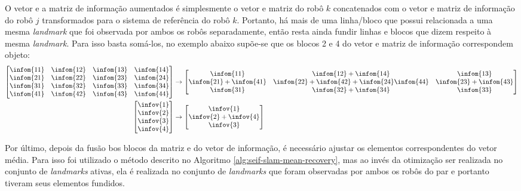 O vetor e a matriz de informação aumentados é simplesmente o vetor e matriz do robô $k$ concatenados com o 
vetor e matriz de informação do robô $j$ transformados para o sistema 
de referência do robô $k$. Portanto, há mais de uma linha/bloco que 
possui relacionada a uma mesma \textit{landmark} que foi observada 
por ambos os robôs separadamente, então resta ainda fundir linhas e 
blocos que dizem respeito à mesma \textit{landmark}. Para isso basta 
somá-los, no exemplo abaixo supõe-se que os blocos 2 e 4 do vetor e 
matriz de informação correspondem objeto:
\begin{align}
  \begin{bmatrix}
    \infom{11} & \infom{12} & \infom{13} & \infom{14}\\
    \infom{21} & \infom{22} & \infom{23} & \infom{24}\\
    \infom{31} & \infom{32} & \infom{33} & \infom{34}\\
    \infom{41} & \infom{42} & \infom{43} & \infom{44}
  \end{bmatrix} &\rightarrow \begin{bmatrix}
    \infom{11} & \infom{12} + \infom{14} & \infom{13}\\
    \infom{21}+\infom{41} & \infom{22}+\infom{42} + \infom{24}\infom{44} & \infom{23}+\infom{43} \\
    \infom{31} & \infom{32} + \infom{34} & \infom{33} \\
  \end{bmatrix}
  \label{eq:info-matrix-fusion}\\
  \begin{bmatrix}
    \infov{1} \\ \infov{2} \\ \infov{3} \\ \infov{4}
  \end{bmatrix} &\rightarrow \begin{bmatrix}
    \infov{1} \\ \infov{2} + \infov{4} \\ \infov{3}
  \end{bmatrix}
\end{align}

Por último, depois da fusão bos blocos da matriz e do vetor de 
informação, é necessário ajustar os elementos correspondentes do vetor 
média. Para isso foi utilizado o método descrito no Algoritmo \ref{alg:seif-slam-mean-recovery}, mas ao invés da otimização ser realizada 
no conjunto de \textit{landmarks} ativas, ela é realizada no conjunto 
de \textit{landmarks} que foram observadas por ambos os robôs do par e
portanto tiveram seus elementos fundidos.

